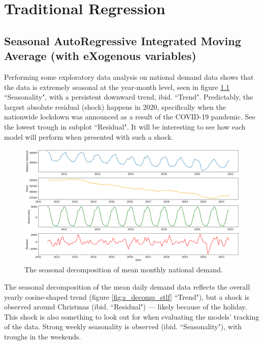\documentclass[12pt]{scrreprt}
\begin{document}
\chapter{Traditional Regression}

\section{Seasonal AutoRegressive Integrated Moving Average (with eXogenous variables)}

Performing some exploratory data analysis on national demand data shows that the data is extremely seasonal at the year-month level, seen in figure \ref{fig:s_decomp_ltlf} ``Seasonality", with a persistent downward trend, ibid. ``Trend". Predictably, the largest absolute residual (shock) happens in 2020, specifically when the nationwide lockdown was announced as a result of the COVID-19 pandemic. See the lowest trough in subplot ``Residual". It will be interesting to see how each model will perform when presented with such a shock.

\begin{figure}[h]
    \centering
    \includegraphics[scale=0.35]{Images/s_decomp_ltlf.png}
    \caption{The seasonal decomposition of mean monthly national demand.}
    \label{fig:s_decomp_ltlf}
\end{figure}

The seasonal decomposition of the mean daily demand data reflects the overall yearly cosine-shaped trend (figure \ref{fig:s_decomp_stlf} ``Trend"), but a shock is observed around Christmas (ibid. ``Residual") --- likely because of the holiday. This shock is also something to look out for when evaluating the models' tracking of the data. Strong weekly seasonality is observed (ibid. ``Seasonality"), with troughs in the weekends.
\end{document}
